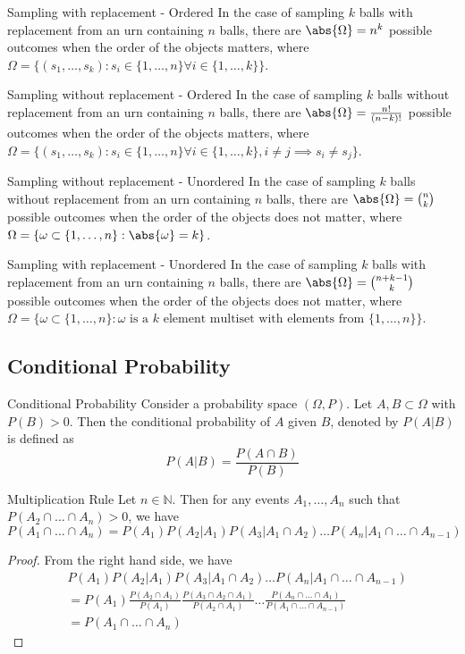 \documentclass[a4paper]{article}
\begin{document}
\begin{thm}{Sampling with replacement - Ordered}{} In the case of sampling $k$ balls with replacement from an urn containing $n$ balls, there are $\abs{\Omega}=n^k$ possible outcomes when the order of the objects matters, where $\Omega=\{(s_1,\dots,s_k):s_i\in\{1,\dots,n\}\forall i\in\{1,\dots,k\}\}$. 
\end{thm}

\begin{thm}{Sampling without replacement - Ordered}{} In the case of sampling $k$ balls without replacement from an urn containing $n$ balls, there are $\abs{\Omega}=\frac{n!}{(n-k)!}$ possible outcomes when the order of the objects matters, where $\Omega=\{(s_1,\dots,s_k):s_i\in\{1,\dots,n\}\forall i\in\{1,\dots,k\},i\neq j\implies s_i\neq s_j\}$. 
\end{thm}

\begin{thm}{Sampling without replacement - Unordered}{} In the case of sampling $k$ balls without replacement from an urn containing $n$ balls, there are $\abs{\Omega}=\binom{n}{k}$ possible outcomes when the order of the objects does not matter, where $\Omega=\{\omega\subset\{1,\dots,n\}:\abs{\omega}=k\}$. 
\end{thm}

\begin{thm}{Sampling with replacement - Unordered}{} In the case of sampling $k$ balls with replacement from an urn containing $n$ balls, there are $\abs{\Omega}=\binom{n+k-1}{k}$ possible outcomes when the order of the objects does not matter, where $\Omega=\{\omega\subset\{1,\dots,n\}:\omega\text{ is a $k$ element multiset with elements from }\{1,\dots,n\}\}$. 
\end{thm}

\subsection{Conditional Probability}
\begin{defn}{Conditional Probability}{} Consider a probability space $(\Omega,P)$. Let $A,B\subset\Omega$ with $P(B)>0$. Then the conditional probability of $A$ given $B$, denoted by $P(A|B)$ is defined as $$P(A|B)=\frac{P(A\cap B)}{P(B)}$$
\end{defn}

\begin{thm}{Multiplication Rule}{} Let $n\in\mathbb{N}$. Then for any events $A_1,\dots,A_n$ such that $P(A_2\cap\dots\cap A_n)>0$, we have $$P(A_1\cap\dots\cap A_n)=P(A_1)P(A_2|A_1)P(A_3|A_1\cap A_2)\dots P(A_n|A_1\cap\dots\cap A_{n-1})$$
\end{thm}
\begin{proof} From the right hand side, we have
\begin{align*}
&P(A_1)P(A_2|A_1)P(A_3|A_1\cap A_2)\dots P(A_n|A_1\cap\dots\cap A_{n-1})\\
&=P(A_1)\frac{P(A_2\cap A_1)}{P(A_1)}\frac{P(A_3\cap A_2\cap A_1)}{P(A_2\cap A_1)}\dots \frac{P(A_n\cap\dots\cap A_1)}{P(A_1\cap\dots\cap A_{n-1})}\\
&=P(A_1\cap\dots\cap A_n)
\end{align*}
\end{proof}
\end{document}
